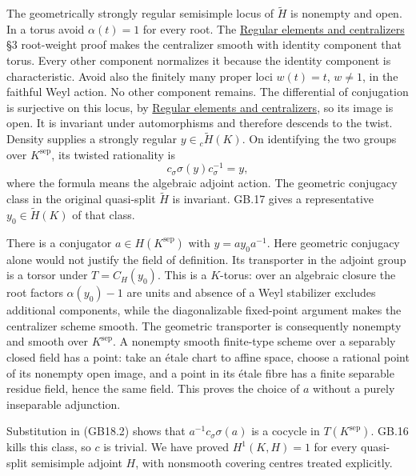 \documentclass[
  11pt,
]{article}
\begin{document}
The geometrically strongly regular semisimple locus of \(\widetilde H\)
is nonempty and open. In a torus avoid \(\alpha(t)=1\) for every root.
The \href{../AG-RG/AG-RG-02.html}{Regular elements and centralizers} §3
root-weight proof makes the centralizer smooth with identity component
that torus. Every other component normalizes it because the identity
component is characteristic. Avoid also the finitely many proper loci
\(w(t)=t\), \(w\ne1\), in the faithful Weyl action. No other component
remains. The differential of conjugation is surjective on this locus, by
\href{../AG-RG/AG-RG-02.html}{Regular elements and centralizers}, so its
image is open. It is invariant under automorphisms and therefore
descends to the twist. Density supplies a strongly regular
\(y\in{}_c\widetilde H(K)\). On identifying the two groups over
\(K^{\mathrm{sep}}\), its twisted rationality is \[
                     c_\sigma\sigma(y)c_\sigma^{-1}=y,       \tag{GB18.2}
\] where the formula means the algebraic adjoint action. The geometric
conjugacy class in the original quasi-split \(\widetilde H\) is
invariant. GB.17 gives a representative \(y_0\in\widetilde H(K)\) of
that class.

There is a conjugator \(a\in H(K^{\mathrm{sep}})\) with
\(y=ay_0a^{-1}\). Here geometric conjugacy alone would not justify the
field of definition. Its transporter in the adjoint group is a torsor
under \(T=C_H(y_0)\). This is a \(K\)-torus: over an algebraic closure
the root factors \(\alpha(y_0)-1\) are units and absence of a Weyl
stabilizer excludes additional components, while the diagonalizable
fixed-point argument makes the centralizer scheme smooth. The geometric
transporter is consequently nonempty and smooth over
\(K^{\mathrm{sep}}\). A nonempty smooth finite-type scheme over a
separably closed field has a point: take an étale chart to affine space,
choose a rational point of its nonempty open image, and a point in its
étale fibre has a finite separable residue field, hence the same field.
This proves the choice of \(a\) without a purely inseparable adjunction.

Substitution in (GB18.2) shows that \(a^{-1}c_\sigma\sigma(a)\) is a
cocycle in \(T(K^{\mathrm{sep}})\). GB.16 kills this class, so \(c\) is
trivial. We have proved \(H^1(K,H)=1\) for every quasi-split semisimple
adjoint \(H\), with nonsmooth covering centres treated explicitly.
\end{document}
